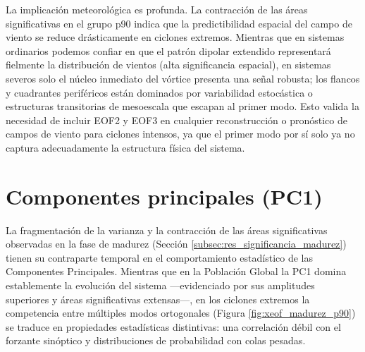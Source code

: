 La implicación meteorológica es profunda. La contracción de las áreas significativas en el grupo p90 indica que la predictibilidad espacial del campo de viento se reduce drásticamente en ciclones extremos. Mientras que en sistemas ordinarios podemos confiar en que el patrón dipolar extendido representará fielmente la distribución de vientos (alta significancia espacial), en sistemas severos solo el núcleo inmediato del vórtice presenta una señal robusta; los flancos y cuadrantes periféricos están dominados por variabilidad estocástica o estructuras transitorias de mesoescala que escapan al primer modo. Esto valida la necesidad de incluir EOF2 y EOF3 en cualquier reconstrucción o pronóstico de campos de viento para ciclones intensos, ya que el primer modo por sí solo ya no captura adecuadamente la estructura física del sistema.

\section{Componentes principales (PC1)}\label{subsec:res_dinamica_pc1}

La fragmentación de la varianza y la contracción de las áreas significativas observadas en la fase de madurez (Sección \ref{subsec:res_significancia_madurez}) tienen su contraparte temporal en el comportamiento estadístico de las Componentes Principales. Mientras que en la Población Global la PC1 domina establemente la evolución del sistema —evidenciado por sus amplitudes superiores y áreas significativas extensas—, en los ciclones extremos la competencia entre múltiples modos ortogonales (Figura \ref{fig:xeof_madurez_p90}) se traduce en propiedades estadísticas distintivas: una correlación débil con el forzante sinóptico y distribuciones de probabilidad con colas pesadas.




